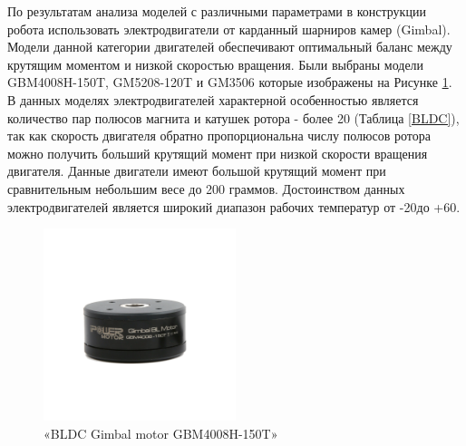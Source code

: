 По результатам анализа моделей с различными параметрами в конструкции робота использовать электродвигатели от карданный шарниров камер (Gimbal). Модели данной категории двигателей обеспечивают оптимальный баланс между крутящим моментом и низкой скоростью вращения. Были выбраны модели GBM4008H-150T, GM5208-120T и GM3506 которые изображены на Рисунке \ref{GBM4008H}. В данных моделях электродвигателей характерной особенностью является количество пар полюсов магнита и катушек ротора - более 20 (Таблица \ref{BLDC}), так как скорость двигателя обратно пропорциональна числу полюсов ротора можно получить больший крутящий момент при низкой скорости вращения двигателя. Данные двигатели имеют большой крутящий момент при сравнительным небольшим весе до 200 граммов. Достоинством данных электродвигателей является широкий диапазон рабочих температур от -20\textdegree  до +60\textdegree \citep{simplefocBLDCMotors}.


\begin{figure}[H]
	\centering
	\includegraphics[width=0.5\textwidth]{Src/images/GM4008H-1.png}
	\caption{«BLDC Gimbal motor GBM4008H-150T»}
	\label{GBM4008H}
\end{figure}

